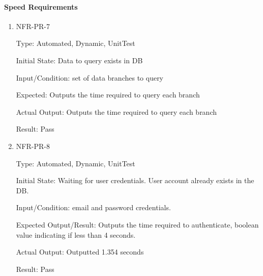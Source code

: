 \documentclass[12pt, titlepage]{article}
\begin{document}
\paragraph{Speed Requirements}
\begin{enumerate}
    \item{NFR-PR-7\\}
    
    Type: Automated, Dynamic, UnitTest
    
    Initial State: Data to query exists in DB
    					
    Input/Condition: set of data branches to query
    					
    Expected: Outputs the time required to query each branch
    					
    Actual Output: Outputs the time required to query each branch
    					
    Result: Pass
    
    \item{NFR-PR-8\\}
    
    Type: Automated, Dynamic, UnitTest
    
    Initial State: Waiting for user credentials. User account already exists in the DB.
    					
    Input/Condition: email and password credentials.
    					
    Expected Output/Result: Outputs the time required to authenticate, boolean value indicating if less than 4 seconds.
    					
    Actual Output: Outputted 1.354 seconds 
    					
    Result: Pass

\end{enumerate}
\end{document}
